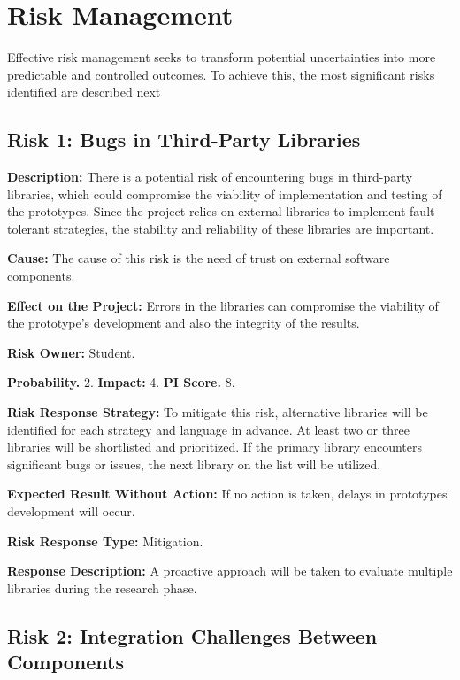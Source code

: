\section{Risk Management}

Effective risk management seeks to transform potential uncertainties into more predictable and controlled outcomes. To achieve this, the most significant risks identified are described next

\subsection{Risk 1: Bugs in Third-Party Libraries}

\textbf{Description:} There is a potential risk of encountering bugs in third-party libraries, which could compromise the viability of implementation and testing of the prototypes. Since the project relies on external libraries to implement fault-tolerant strategies, the stability and reliability of these libraries are important.

\textbf{Cause:} The cause of this risk is the need of trust on external software components.

\textbf{Effect on the Project:} Errors in the libraries can compromise the viability of the prototype's development and also the integrity of the results.

\textbf{Risk Owner:} Student.

\textbf{Probability.} 2. \textbf{Impact:} 4. \textbf{PI Score.} 8.

\textbf{Risk Response Strategy:} To mitigate this risk, alternative libraries will be identified for each strategy and language in advance. At least two or three libraries will be shortlisted and prioritized. If the primary library encounters significant bugs or issues, the next library on the list will be utilized.

\textbf{Expected Result Without Action:} If no action is taken, delays in prototypes development will occur.

\textbf{Risk Response Type:} Mitigation.

\textbf{Response Description:} A proactive approach will be taken to evaluate multiple libraries during the research phase.


\subsection{Risk 2: Integration Challenges Between Components}

